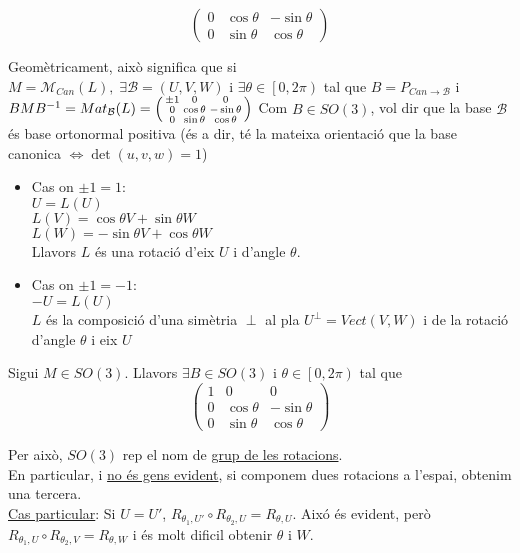 \documentclass[../main.tex]{subfiles}
\begin{document}
\begin{itemize}
\begin{proposicio}
\begin{displaymath}
\begin{pmatrix}
                0 & \cos{\theta} & -\sin{\theta}\\
                0 & \sin{\theta} & \cos{\theta}
            \end{pmatrix}
        \end{displaymath}
    \end{proposicio}
    Geomètricament, això significa que si $M = \mathcal{M}_{\textit{Can}} (L),\; \exists \mathcal{B} = \left(U, V, W\right)\text{ i }\exists \theta \in \left[0, 2\pi\right)$
    tal que $B = P_{\textit{Can}\to\mathcal{B}}$ i $BMB^{-1} = Mat_\mathcal{B}(L) = \begin{psmallmatrix}
        \pm 1 & 0 & 0\\
        0 & \cos{\theta} & -\sin{\theta}\\
        0 & \sin{\theta} & \cos{\theta}
    \end{psmallmatrix}$
    Com $B \in SO(3)$, vol dir que la base $\mathcal{B}$ és base ortonormal positiva (és a dir, té
    la mateixa orientació que la base canonica $\Leftrightarrow \det{\left(u,v,w\right)} = 1$)
    \begin{itemize}
        \item Cas on $\pm 1 = 1$:\\
        $U = L(U)$\\
        $L(V) = \cos{\theta}V + \sin{\theta}W$\\
        $L(W) = -\sin{\theta}V + \cos{\theta}W$\\
        Llavors $L$ és una rotació d'eix $U$ i d'angle $\theta$.
        \item Cas on $\pm 1 = -1$:\\
        $-U = L(U)$\\
        $L$ és la composició d'una simètria $\perp$ al pla $U^\perp = Vect(V, W)$ i de la rotació
        d'angle $\theta$ i eix $U$
    \end{itemize}
    \begin{teorema}
        Sigui $M\in SO(3)$. Llavors $\exists B \in SO(3)$ i $\theta \in \left[0, 2\pi\right)$ tal que
        \begin{displaymath}
            \begin{pmatrix}
                1 & 0 & 0\\
                0 & \cos{\theta} & -\sin{\theta}\\
                0 & \sin{\theta} & \cos{\theta}
            \end{pmatrix}
        \end{displaymath}
    \end{teorema}
    Per això, $SO(3)$ rep el nom de \underline{grup de les rotacions}.\\
    En particular, i \underline{no és gens evident}, si componem dues rotacions a l'espai, obtenim
    una tercera.\\
    \underline{Cas particular}: Si $U = U'$, $R_{\theta_1,U'}\circ R_{\theta_2,U} = R_{\theta,U}$.
    Aixó és evident, però $R_{\theta_1,U}\circ R_{\theta_2,V} = R_{\theta,W}$ i és molt dificil
    obtenir $\theta$ i $W$.
\end{itemize}
\end{document}
